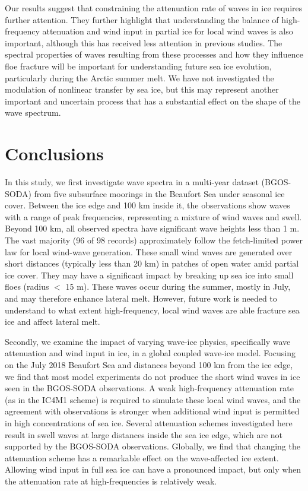 \documentclass [11pt, proquest] {uwthesis}[2020/02/24]
\begin{document}
Our results suggest that constraining the attenuation rate of waves in ice requires further attention. They further highlight that understanding the balance of high-frequency attenuation and wind input in partial ice for local wind waves is also important, although this has received less attention in previous studies. The spectral properties of waves resulting from these processes and how they influence floe fracture will be important for understanding future sea ice evolution, particularly during the Arctic summer melt. We have not investigated the modulation of nonlinear transfer by sea ice, but this may represent another important and uncertain process that has a substantial effect on the shape of the wave spectrum.   

 
\chapter{Conclusions} \label{conclusion}

In this study, we first investigate wave spectra in a multi-year dataset (BGOS-SODA) from five subsurface moorings in the Beaufort Sea under seasonal ice cover. Between the ice edge and 100 km inside it, the observations show waves with a range of peak frequencies, representing a mixture of wind waves and swell. Beyond 100 km, all observed spectra have significant wave heights less than 1 m. The vast majority (96 of 98 records) approximately follow the fetch-limited power law for local wind-wave generation. These small wind waves are generated over short distances (typically less than 20 km) in patches of open water amid partial ice cover. They may have a significant impact by breaking up sea ice into small floes (radius $<$ 15 m). These waves occur during the summer, mostly in July, and may therefore enhance lateral melt. However, future work is needed to understand to what extent high-frequency, local wind waves are able fracture sea ice and affect lateral melt.  

Secondly, we examine the impact of varying wave-ice physics, specifically wave attenuation and wind input in ice, in a global coupled wave-ice model. Focusing on the July 2018 Beaufort Sea and distances beyond 100 km from the ice edge, we find that most model experiments do not produce the short wind waves in ice seen in the BGOS-SODA observations. A weak high-frequency attenuation rate (as in the IC4M1 scheme) is required to simulate these local wind waves, and the agreement with observations is stronger when additional wind input is permitted in high concentrations of sea ice. Several attenuation schemes investigated here result in swell waves at large distances inside the sea ice edge, which are not supported by the BGOS-SODA observations. Globally, we find that changing the attenuation scheme has a remarkable effect on the wave-affected ice extent. Allowing wind input in full sea ice can have a pronounced impact, but only when the attenuation rate at high-frequencies is relatively weak.
\end{document}

